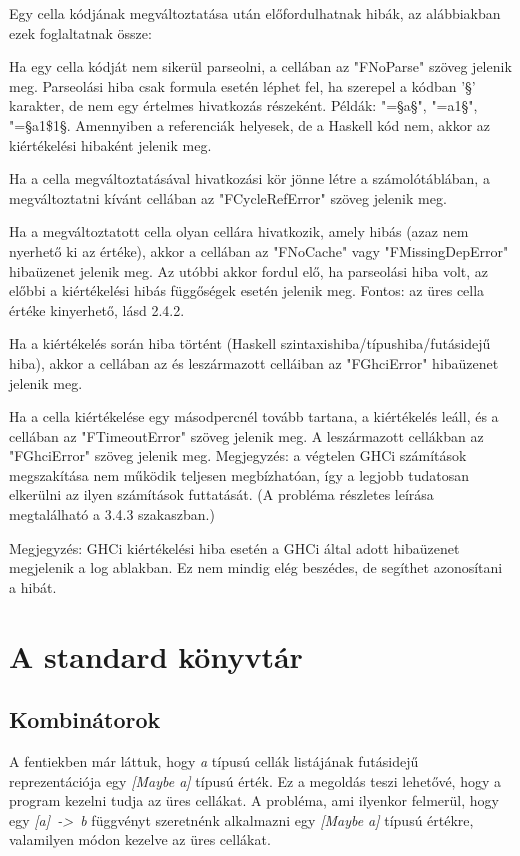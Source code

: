 Egy cella kódjának megváltoztatása után előfordulhatnak hibák, az alábbiakban ezek foglaltatnak össze:
\begin{compactenum}
	\item Ha egy cella kódját nem sikerül parseolni, a cellában az "FNoParse" szöveg jelenik meg. Parseolási hiba csak formula esetén léphet fel, ha szerepel a kódban '§' karakter, de nem egy értelmes hivatkozás részeként. Példák: "=§a§", "=a1§", "=§a1\$1§. Amennyiben a referenciák helyesek, de a Haskell kód nem, akkor az kiértékelési hibaként jelenik meg.
	\item Ha a cella megváltoztatásával hivatkozási kör jönne létre a számolótáblában, a megváltoztatni kívánt cellában az "FCycleRefError" szöveg jelenik meg.
	\item Ha a megváltoztatott cella olyan cellára hivatkozik, amely hibás (azaz nem nyerhető ki az értéke), akkor a cellában az "FNoCache" vagy "FMissingDepError" hibaüzenet jelenik meg. Az utóbbi akkor fordul elő, ha parseolási hiba volt, az előbbi a kiértékelési hibás függőségek esetén jelenik meg. Fontos: az üres cella értéke kinyerhető, lásd 2.4.2. 
	\item Ha a kiértékelés során hiba történt (Haskell szintaxishiba/típushiba/futásidejű hiba), akkor a cellában az és leszármazott celláiban az "FGhciError" hibaüzenet jelenik meg.
	\item Ha a cella kiértékelése egy másodpercnél tovább tartana, a kiértékelés leáll, és a cellában az "FTimeoutError" szöveg jelenik meg. A leszármazott cellákban az "FGhciError" szöveg jelenik meg. Megjegyzés: a végtelen GHCi számítások megszakítása nem működik teljesen megbízhatóan, így a legjobb tudatosan elkerülni az ilyen számítások futtatását. (A probléma részletes leírása megtalálható a 3.4.3 szakaszban.)
\end{compactenum}
	
Megjegyzés: GHCi kiértékelési hiba esetén a GHCi által adott hibaüzenet megjelenik a log ablakban. Ez nem mindig elég beszédes, de segíthet azonosítani a hibát.

\section{A standard könyvtár}

\subsection{Kombinátorok}

A fentiekben már láttuk, hogy \textit{a} típusú cellák listájának futásidejű reprezentációja egy \textit{[Maybe a]} típusú érték. Ez a megoldás teszi lehetővé, hogy a program kezelni tudja az üres cellákat. A probléma, ami ilyenkor felmerül, hogy egy \mbox{\textit{[a] -> b}} függvényt szeretnénk alkalmazni egy \textit{[Maybe a]} típusú értékre, valamilyen módon kezelve az üres cellákat.

